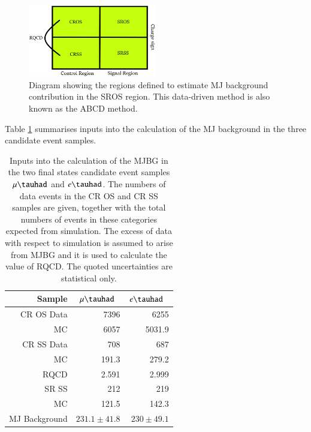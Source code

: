 \begin{figure}[htbp]
	\centering
	\includegraphics[width=0.5\textwidth]{figures/Fig7.png}
	\caption{Diagram showing the regions defined to estimate MJ background contribution in the SROS region. This data-driven method is also known as the ABCD method.}
	\label{Fig7}
\end{figure}
Table \ref{tab:MJ} summarises inputs into the calculation of the MJ background in the three candidate event samples. 
\begin{table}[htbp]
	\centering
	\begin{tabular}{rrr}
		Sample &             $\mu \tauhad$\ & $e \tauhad$\  \\
		\toprule
		CR OS Data &       7396    & 6255   \\
		MC          &       6057    & 5031.9   \\ 
		CR SS Data &       708    & 687    \\
		MC      &       191.3      & 279.2     \\
		\toprule
		RQCD      &      2.591   & 2.999  \\
		\toprule
		SR SS     &      212    & 219   \\
		MC     &       121.5    &  142.3   \\
		\toprule
		MJ Background        &      $231.1 \pm 41.8$    & $230 \pm 49.1$    \\          
		
		
	\end{tabular}
	\caption{Inputs into the calculation of the MJBG in the two final states candidate event samples  $\mu\tauhad$ and $e\tauhad$.
		The numbers of data events in the CR OS and CR SS samples are given, together with the total numbers of events in these
		categories expected from simulation.
		The excess of data with respect to simulation is assumed to arise from MJBG and it is used to calculate the value of RQCD.
		The quoted uncertainties are statistical only.
	}
	\label{tab:MJ}
\end{table}


